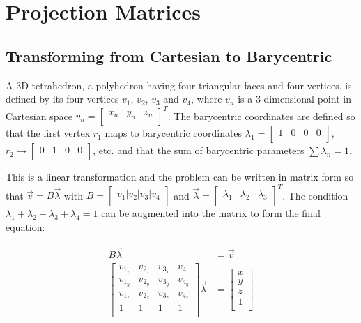 \section{Projection Matrices}

\subsection{Transforming from Cartesian to Barycentric}

A 3D tetrahedron,  a  polyhedron having four triangular faces and four vertices,
is defined  by its four vertices $v_1$, $v_2$, $v_3$ and $v_4$, where $v_n$ is a
3 dimensional point in Cartesian space $v_n = \begin{bmatrix} x_n & y_n & z_n \\
\end{bmatrix}^T$.  The  barycentric  coordinates  are defined so that the  first
vertex $r_1$ maps to barycentric coordinates $\lambda_1 = \begin{bmatrix} 1  & 0
&  0 & 0 \\ \end{bmatrix}$,  $r_2  \to  \begin{bmatrix}  0  &  1  &  0  &  0  \\
\end{bmatrix}$, etc. and that the sum of barycentric parameters $\sum\lambda_n
= 1$.

This is a linear transformation and the problem can be written in matrix form so
that  $\vec{v}  = B\vec{\lambda}$  with  $B=\begin{bmatrix}  v_1|v_2|v_3|v_4  \\
\end{bmatrix}$  and  $\vec{\lambda}  =  \begin{bmatrix} \lambda_1 & \lambda_2  &
\lambda_3 \\ \end{bmatrix}^T$.  The condition $\lambda_1 + \lambda_2 + \lambda_3
+  \lambda_4 = 1$ can be augmented into the matrix to form the  final  equation:

\begin{align}
    \label{eq:bary:cartesian}
    B\vec{\lambda} &= \vec{v} \\
    \begin{bmatrix}
        v_{1_x} & v_{2_x} & v_{3_x} & v_{4_x} \\
        v_{1_y} & v_{2_y} & v_{3_y} & v_{4_y} \\
        v_{1_z} & v_{2_z} & v_{3_z} & v_{4_z} \\
        1 & 1 & 1 & 1 \\
    \end{bmatrix}
    \vec{\lambda} &= \begin{bmatrix}
        x \\
        y \\
        z \\
        1 \\
    \end{bmatrix} \\
\end{align}

